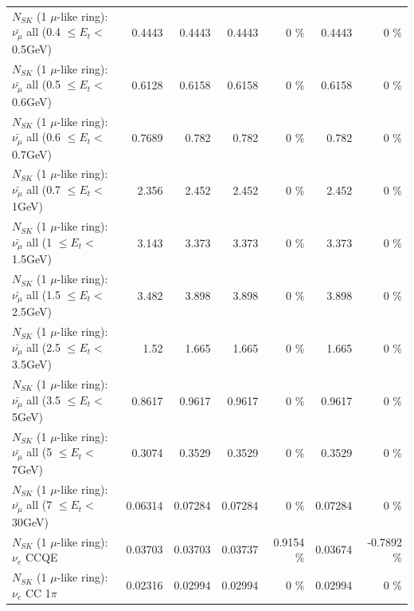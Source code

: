 \begin{table}
\begin{tabular}{| l | r | r | r  r | r  r |}
 $N_{SK}$ (1 $\mu$-like ring): $\bar{\nu_{\mu}}$ all (0.4 $\leq E_{t} <$ 0.5GeV) &          0.4443 &          0.4443 &          0.4443 &        0 \%  &          0.4443 &        0 \%  \\ 
 $N_{SK}$ (1 $\mu$-like ring): $\bar{\nu_{\mu}}$ all (0.5 $\leq E_{t} <$ 0.6GeV) &          0.6128 &          0.6158 &          0.6158 &        0 \%  &          0.6158 &        0 \%  \\ 
 $N_{SK}$ (1 $\mu$-like ring): $\bar{\nu_{\mu}}$ all (0.6 $\leq E_{t} <$ 0.7GeV) &          0.7689 &           0.782 &           0.782 &        0 \%  &           0.782 &        0 \%  \\ 
   $N_{SK}$ (1 $\mu$-like ring): $\bar{\nu_{\mu}}$ all (0.7 $\leq E_{t} <$ 1GeV) &           2.356 &           2.452 &           2.452 &        0 \%  &           2.452 &        0 \%  \\ 
   $N_{SK}$ (1 $\mu$-like ring): $\bar{\nu_{\mu}}$ all (1 $\leq E_{t} <$ 1.5GeV) &           3.143 &           3.373 &           3.373 &        0 \%  &           3.373 &        0 \%  \\ 
 $N_{SK}$ (1 $\mu$-like ring): $\bar{\nu_{\mu}}$ all (1.5 $\leq E_{t} <$ 2.5GeV) &           3.482 &           3.898 &           3.898 &        0 \%  &           3.898 &        0 \%  \\ 
 $N_{SK}$ (1 $\mu$-like ring): $\bar{\nu_{\mu}}$ all (2.5 $\leq E_{t} <$ 3.5GeV) &            1.52 &           1.665 &           1.665 &        0 \%  &           1.665 &        0 \%  \\ 
   $N_{SK}$ (1 $\mu$-like ring): $\bar{\nu_{\mu}}$ all (3.5 $\leq E_{t} <$ 5GeV) &          0.8617 &          0.9617 &          0.9617 &        0 \%  &          0.9617 &        0 \%  \\ 
     $N_{SK}$ (1 $\mu$-like ring): $\bar{\nu_{\mu}}$ all (5 $\leq E_{t} <$ 7GeV) &          0.3074 &          0.3529 &          0.3529 &        0 \%  &          0.3529 &        0 \%  \\ 
    $N_{SK}$ (1 $\mu$-like ring): $\bar{\nu_{\mu}}$ all (7 $\leq E_{t} <$ 30GeV) &         0.06314 &         0.07284 &         0.07284 &        0 \%  &         0.07284 &        0 \%  \\ 
\hline
\hline
\hline
                                      $N_{SK}$ (1 $\mu$-like ring): $\nu_e$ CCQE &         0.03703 &         0.03703 &         0.03737 &   0.9154 \%  &         0.03674 &  -0.7892 \%  \\ 
                                 $N_{SK}$ (1 $\mu$-like ring): $\nu_e$ CC 1$\pi$ &         0.02316 &         0.02994 &         0.02994 &        0 \%  &         0.02994 &        0 \%  \\ 

\end{tabular}
\end{table}
